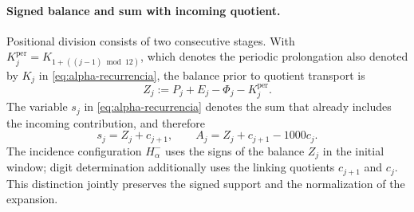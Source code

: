 \paragraph{Signed balance and sum with incoming quotient.}
\label{ampl-alfa-z-s-aclaracion}
Positional division consists of two consecutive stages. With
\(K_j^{\mathrm{per}}=K_{1+((j-1)\bmod12)}\), which denotes the
periodic prolongation also denoted by \(K_j\) in
\eqref{eq:alpha-recurrencia}, the balance prior to quotient
transport is
\[
 Z_j:=P_j+E_j-\Phi_j-K_j^{\mathrm{per}}.
\]
The variable $s_j$ in \eqref{eq:alpha-recurrencia} denotes the sum that already
includes the incoming contribution, and therefore
\[
 s_j=Z_j+c_{j+1},\qquad
 A_j=Z_j+c_{j+1}-1000c_j.
\]
The incidence configuration
$H^-_\alpha$ uses the signs of the balance $Z_j$ in the initial window;
digit determination additionally uses the linking quotients
$c_{j+1}$ and $c_j$. This distinction jointly preserves the signed
support and the normalization of the expansion.
